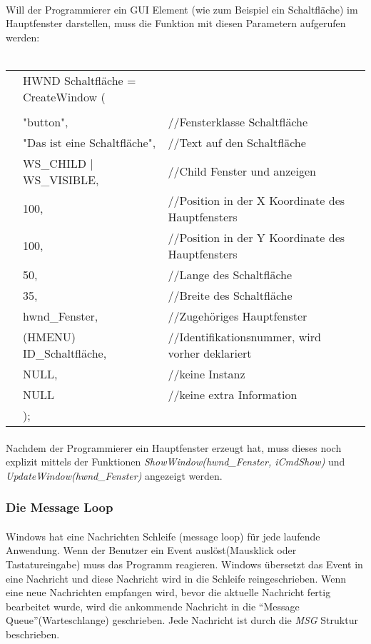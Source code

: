 \paragraph{}
Will der Programmierer ein GUI Element (wie zum Beispiel ein Schaltfläche) im Hauptfenster darstellen, muss die Funktion mit diesen Parametern aufgerufen werden:
\\
\\
\begin{tabular}{llll}
& HWND Schaltfläche = CreateWindow (\\
\\
& "button",					& //Fensterklasse Schaltfläche\\
& "Das ist eine Schaltfläche",		& //Text auf den Schaltfläche\\
& WS\_CHILD | WS\_VISIBLE,	& //Child Fenster und anzeigen\\
& 100,						& //Position in der X Koordinate des Hauptfensters\\
& 100,						& //Position in der Y Koordinate des Hauptfensters\\
& 50,						& //Lange des Schaltfläche\\
& 35,						& //Breite des Schaltfläche\\
& hwnd\_Fenster,				& //Zugehöriges Hauptfenster\\
& (HMENU) ID\_Schaltfläche,			& //Identifikationsnummer, wird vorher deklariert\\
& NULL,						& //keine Instanz\\
& NULL						& //keine extra Information\\
& );
\end{tabular}

\paragraph{}	
					
Nachdem der Programmierer ein Hauptfenster erzeugt hat, muss dieses noch explizit mittels der Funktionen \textit{ShowWindow(hwnd\_Fenster, iCmdShow)} und \textit{UpdateWindow(hwnd\_Fenster)}	angezeigt werden.

\subsubsection{Die Message Loop}
\paragraph{}
Windows hat eine Nachrichten Schleife (message loop) für jede laufende Anwendung. Wenn der Benutzer ein Event auslöst(Mausklick oder Tastatureingabe) muss das Programm reagieren. Windows übersetzt das Event in eine Nachricht und diese Nachricht wird in die Schleife reingeschrieben. Wenn eine neue Nachrichten empfangen wird, bevor die aktuelle Nachricht fertig bearbeitet wurde, wird die ankommende Nachricht in die "`Message Queue"'(Warteschlange) geschrieben. Jede Nachricht ist durch die \textit{MSG} Struktur beschrieben.

